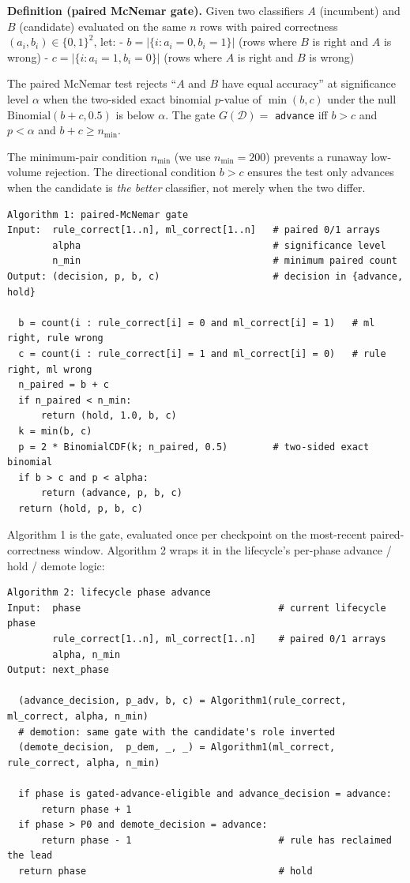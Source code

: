 \textbf{Definition (paired McNemar gate).} Given two classifiers \(A\)
(incumbent) and \(B\) (candidate) evaluated on the same \(n\) rows with
paired correctness \((a_i, b_i) \in \{0,1\}^2\), let: -
\(b = |\{i : a_i = 0, b_i = 1\}|\) (rows where \(B\) is right and \(A\)
is wrong) - \(c = |\{i : a_i = 1, b_i = 0\}|\) (rows where \(A\) is
right and \(B\) is wrong)

The paired McNemar test rejects ``\(A\) and \(B\) have equal accuracy''
at significance level \(\alpha\) when the two-sided exact binomial
\(p\)-value of \(\min(b, c)\) under the null
\(\text{Binomial}(b + c, 0.5)\) is below \(\alpha\). The gate
\(G(\mathcal{D}) =\) \texttt{advance} iff \(b > c\) and \(p < \alpha\)
and \(b + c \ge n_{\min}\).

The minimum-pair condition \(n_{\min}\) (we use \(n_{\min} = 200\))
prevents a runaway low-volume rejection. The directional condition
\(b > c\) ensures the test only advances when the candidate is \emph{the
better} classifier, not merely when the two differ.

\begin{verbatim}
Algorithm 1: paired-McNemar gate
Input:  rule_correct[1..n], ml_correct[1..n]   # paired 0/1 arrays
        alpha                                  # significance level
        n_min                                  # minimum paired count
Output: (decision, p, b, c)                    # decision in {advance, hold}

  b = count(i : rule_correct[i] = 0 and ml_correct[i] = 1)   # ml right, rule wrong
  c = count(i : rule_correct[i] = 1 and ml_correct[i] = 0)   # rule right, ml wrong
  n_paired = b + c
  if n_paired < n_min:
      return (hold, 1.0, b, c)
  k = min(b, c)
  p = 2 * BinomialCDF(k; n_paired, 0.5)        # two-sided exact binomial
  if b > c and p < alpha:
      return (advance, p, b, c)
  return (hold, p, b, c)
\end{verbatim}

Algorithm 1 is the gate, evaluated once per checkpoint on the
most-recent paired-correctness window. Algorithm 2 wraps it in the
lifecycle's per-phase advance / hold / demote logic:

\begin{verbatim}
Algorithm 2: lifecycle phase advance
Input:  phase                                   # current lifecycle phase
        rule_correct[1..n], ml_correct[1..n]    # paired 0/1 arrays
        alpha, n_min
Output: next_phase

  (advance_decision, p_adv, b, c) = Algorithm1(rule_correct, ml_correct, alpha, n_min)
  # demotion: same gate with the candidate's role inverted
  (demote_decision,  p_dem, _, _) = Algorithm1(ml_correct,  rule_correct, alpha, n_min)

  if phase is gated-advance-eligible and advance_decision = advance:
      return phase + 1
  if phase > P0 and demote_decision = advance:
      return phase - 1                          # rule has reclaimed the lead
  return phase                                  # hold
\end{verbatim}

